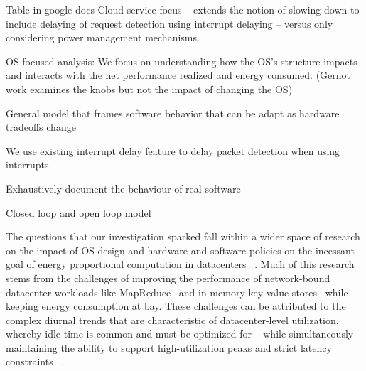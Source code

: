 \label{sec:related}

Table in google docs
Cloud service focus -- extends the notion of slowing down to include delaying of request detection using interrupt delaying -- versus only considering power management mechanisms.

OS focused analysis: We focus on understanding how the OS's structure impacts and interacts with the net performance realized and energy consumed.  
(Gernot work examines the knobs but not the impact of changing the OS)

General model that frames software behavior that can be adapt as hardware tradeoffs change 

We use existing interrupt delay feature to delay packet detection when using interrupts.

Exhaustively document the behaviour of real software

Closed loop and open loop model 

The questions that our investigation sparked
fall within a wider space of research
on the impact of OS design
and hardware and software policies
on the incessant goal of energy proportional computation in datacenters
~\cite{energyproportion, warehouse-power}.
Much of this research stems from
the challenges of improving the performance of
network-bound datacenter workloads
like MapReduce~\cite{large-scale-mapreduce}
and in-memory key-value stores~\cite{mica, zygos}
while keeping energy consumption at bay.
These challenges can be attributed to
the complex diurnal trends
that are characteristic of datacenter-level utilization,
whereby idle time is common and must be optimized for
~\cite{hotpower2008, powernap, napsac}
while simultaneously maintaining the ability to support high-utilization peaks and strict latency constraints
~\cite{Dynamo, SmoothOperator, oldi-pegasus, adrenaline, ixcp, rubik, eurosys14, zygos}.



